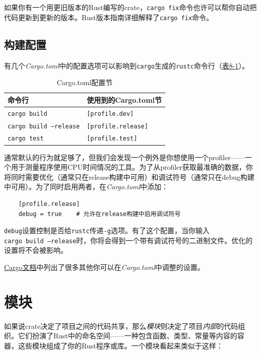 如果你有一个用更旧版本的Rust编写的crate，\texttt{cargo fix}命令也许可以帮你自动把代码更新到更新的版本。Rust版本指南详细解释了\texttt{cargo fix}命令。

\subsection{构建配置}
有几个\emph{Cargo.toml}中的配置选项可以影响到\texttt{cargo}生成的\texttt{rustc}命令行（\hyperref[t8-1]{表8-1}）。

\begin{table}[htbp]
    \centering
    \caption{Cargo.toml配置节}
    \label{t8-1}
    \begin{tabular}{ll}
        \hline
        \textbf{命令行}     & \textbf{使用到的Cargo.toml节}   \\
        \hline
        \texttt{cargo build} & \texttt{[profile.dev]}   \\
        \rowcolor{tablecolor}
        \texttt{cargo build --release} & \texttt{[profile.release]} \\
        \texttt{cargo test}  & \texttt{[profile.test]}  \\
    \end{tabular}
\end{table}

通常默认的行为就足够了，但我们会发现一个例外是你想使用一个profiler——一个用于测量程序使用CPU时间情况的工具。为了从profiler获取最准确的数据，你将同时需要优化（通常只在release构建中可用）和调试符号（通常只在debug构建中可用）。为了同时启用两者，在\emph{Cargo.toml}中添加：
\begin{verbatim}
    [profile.release]
    debug = true    # 允许在release构建中启用调试符号
\end{verbatim}

\texttt{debug}设置控制是否给\texttt{rustc}传递\texttt{-g}选项。有了这个配置，当你输入\\
\texttt{cargo build --release}时，你将会得到一个带有调试符号的二进制文件。优化的设置将不会被影响。

\href{https://doc.rust-lang.org/cargo/reference/manifest.html}{Cargo文档}中列出了很多其他你可以在\emph{Cargo.toml}中调整的设置。

\section{模块}

如果说crate决定了项目之间的代码共享，那么\emph{模块}则决定了项目\emph{内部}的代码组织。它们扮演了Rust中的命名空间——一种包含函数、类型、常量等内容的容器，这些模块组成了你的Rust程序或库。一个模块看起来类似于这样：

